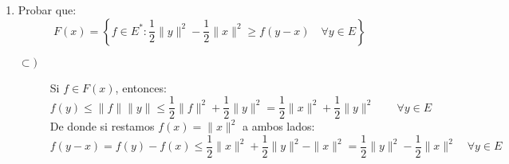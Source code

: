 \begin{ejercicio}
\begin{enumerate}[label=\alph*)]
            Que $E^\ast$ sea estrictamente convexo significa que si tomamos $f,g\in E^\ast$ con $f\neq g$ y $\|f\| = 1 = \|g\|$, entonces:
            \begin{equation*}
                \|tf + (1-t)g\| < 1 \qquad \forall t\in \left]0,1\right[
            \end{equation*}
            Si $x=0$ entonces $F(x)$ es unitario. Si $x\neq 0$, supongamos que existen dos funciones $g_1,g_2\in F(x)$ con $g_1\neq g_2$. En cuyo caso, podemos tomar:
            \begin{equation*}
                f_1 = \dfrac{g_1}{\|x\|}, \qquad f_2 = \dfrac{g_2}{\|x\|}
            \end{equation*}
            que verifican $f_1\neq f_2$ y $\|f_1\| = 1 = \|f_2\|$. Por la convexidad estricta de $E^\ast$ tenemos que:
            \begin{equation*}
                \|tf_1 + (1-t)f_2\| < 1 \qquad \forall t\in \left]0,1\right[
            \end{equation*}
            Sin embargo, fijado $t\in \left]0,1\right[$, vemos que:
            \begin{equation*}
                \|x\| = t\|x\| + (1-t)\|x\| = (tf_1+(1-t)f_2)(x) \leq \|tf_1+(1-t)f_2\|\|x\|
            \end{equation*}
            de donde deducimos que $\|tf_1 + (1-t)f_2\|\geq 1$, \underline{contradicción}, que viene de suponer que $F(x)$ contiene dos elementos distintos.
        \item Probar que:
            \begin{equation*}
                F(x) = \left\{f\in E^\ast : \dfrac{1}{2}\|y\|^2 - \dfrac{1}{2}\|x\|^2 \geq f(y-x)\quad \forall y\in E\right\}
            \end{equation*}
            \begin{description}
                \item [$\subset )$] Si $f\in F(x)$, entonces:
                    \begin{equation*}
                        f(y) \leq \|f\|\|y\| \leq \dfrac{1}{2}\|f\|^2 + \dfrac{1}{2}\|y\|^2 = \dfrac{1}{2}\|x\|^2 + \dfrac{1}{2}\|y\|^2 \qquad \forall y\in E
                    \end{equation*}
                    De donde si restamos $f(x) = \|x\|^2$ a ambos lados:
                    \begin{equation*}
                        f(y-x) = f(y) - f(x)\leq \dfrac{1}{2} \|x\|^2 + \dfrac{1}{2}\|y\|^2 - \|x\|^2 = \dfrac{1}{2}\|y\|^2 - \dfrac{1}{2}\|x\|^2 \quad \forall y\in E

\end{equation*}
\end{description}
\end{enumerate}
\end{ejercicio}
